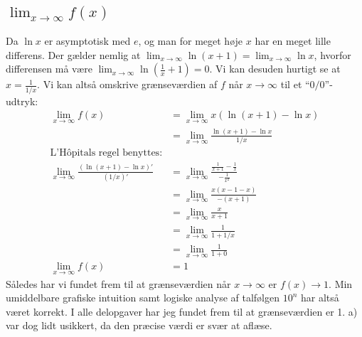 \documentclass{report}
\begin{document}
\subsection{$\lim_{x\to\infty}f(x)$}
Da $\ln{x}$ er asymptotisk med $e$, og man for meget høje $x$ har en meget lille differens. Der gælder nemlig at $\lim_{x\to\infty}\ln{(x+1)}=\lim_{x\to\infty}\ln{x}$, hvorfor differensen må være $\lim_{x\to\infty}\ln{(\frac{1}{x}+1)}=0$. Vi kan desuden hurtigt se at $x=\frac{1}{1/x}$. Vi kan altså omskrive grænseværdien af $f$ når $x\to\infty$ til et \enquote{$0/0$}-udtryk:
\begin{align*}
    \lim_{x\to\infty}f(x)&=\lim_{x\to\infty}x(\ln{(x+1)}-\ln{x})\\
    &=\lim_{x\to\infty}\frac{\ln{(x+1)}-\ln{x}}{1/x}\\
    \text{L'Hôpitals regel benyttes:}\\
    \lim_{x\to\infty}\frac{(\ln{(x+1)}-\ln{x})'}{(1/x)'}&=\lim_{x\to\infty}\frac{\frac{1}{x+1}-\frac{1}{x}}{-\frac{1}{x^2}}\\
    &=\lim_{x\to\infty}\frac{x(x-1-x)}{-(x+1)}\\&=\lim_{x\to\infty}\frac{x}{x+1}\\
    &=\lim_{x\to\infty}\frac{1}{1+1/x}\\
    &=\lim_{x\to\infty}\frac{1}{1+0}\\
    \lim_{x\to\infty}f(x)&=1
\end{align*}
Således har vi fundet frem til at grænseværdien når $x\to\infty$ er $f(x)\to1$. Min umiddelbare grafiske intuition samt logiske analyse af talfølgen $10^n$ har altså været korrekt. I alle delopgaver har jeg fundet frem til at grænseværdien er 1. a) var dog lidt usikkert, da den præcise værdi er svær at aflæse.
\end{document}
